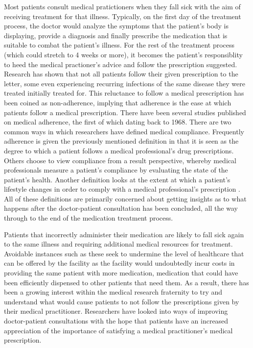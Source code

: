 Most patients consult medical pratictioners when they fall sick with the aim of receiving treatment for that illness. Typically, on the first day of the treatment process, the doctor would analyze the symptoms that the patient's body is displaying, provide a diagnosis and finally prescribe the medication that is suitable to combat the patient's illness. For the rest of the treatment process (which could stretch to 4 weeks or more), it becomes the patient's responsiblity to heed the medical practioner's advice and follow the prescription suggested. Research has shown that not all patients follow their given prescription to the letter, some even experiencing recurring infections of the same disease they were treated initially treated for\cite{Vern01}. This reluctance to follow a medical prescription has been coined as non-adherence, implying that adherence is the ease at which patients follow a medical prescription\cite{Vern01}. There have been several studies published on medical adherence, the first of which dating back to 1968\cite{Fernerty12}. There are two common ways in which researchers have defined medical compliance. Frequently adherence is given the previously mentioned definition in that it is seen as the degree to which a patient follows a medical professional's drug prescriptions\cite{Vern01, Fernerty12}. Others choose to view compliance from a result perspective, whereby medical professionals measure a patient's compliance by evaluating the state of the patient's health. Another definition looks at the extent at which a patient's lifestyle changes in order to comply with a medical professional's prescription \cite{Vern01}. All of these definitions are primarily concerned about getting insights as to what happens after the doctor-patient consultation has been concluded, all the way through to the end of the medication treatment process.

Patients that incorrectly administer their medication are likely to fall sick again to the same illness and requiring additional medical resources for treatment\cite{Vern01, Kali99}. Avoidable instances such as these seek to undermine the level of healthcare that can be offered by the facility as the facility would undoubtedly incur costs in providing the same patient with more medication, medication that could have been efficiently dispensed to other patients that need them\cite{Vern01}. As a result, there has been a growing interest within the medical research fraternity to try and understand what would cause patients to not follow the prescriptions given by their medical practitioner. Researchers have looked into ways of improving doctor-patient consultations with the hope that patients have an increased appreciation of the importance of satisfying a medical practitioner's medical prescription.

